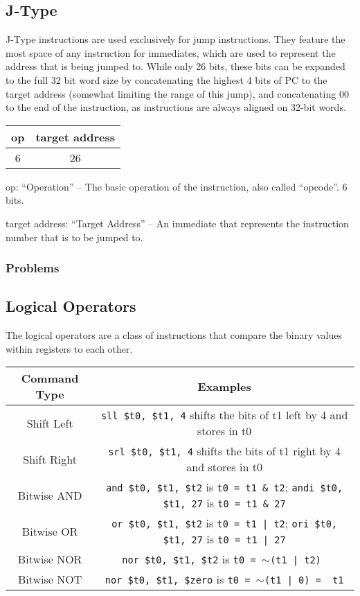\documentclass{article}
\begin{document}
\subsection{J-Type}\label{JType}

J-Type instructions are used exclusively for jump instructions. They feature the most space of any instruction for immediates, which are used to represent the address that is being jumped to. While only 26 bits, these bits can be expanded to the full 32 bit word size by concatenating the highest 4 bits of PC to the target address (somewhat limiting the range of this jump), and concatenating 00 to the end of the instruction, as instructions are always aligned on 32-bit words. 

\begin{tabular}{| c | c |}
    \hline
        op & target address \\
        \hline
        6 & 26 \\
    \hline
\end{tabular}

op: ``Operation'' -- The basic operation of the instruction, also called ``opcode''. 6 bits.

target address: ``Target Address'' -- An immediate that represents the instruction number that is to be jumped to. 

\subsubsection{Problems}\label{JTypeProblems}


\subsection{Logical Operators}

The logical operators are a class of instructions that compare the binary values within registers to each other. 

\begin{tabular}{| c | c |}
    \hline
        Command Type & Examples \\
        \hline
        Shift Left & \texttt{sll \$t0, \$t1, 4} shifts the bits of t1 left by 4 and stores in t0 \\
        \hline
        Shift Right & \texttt{srl \$t0, \$t1, 4} shifts the bits of t1 right by 4 and stores in t0 \\
    \hline
    Bitwise AND & \texttt{and \$t0, \$t1, \$t2} is \texttt{t0 = t1 \& t2}; \texttt{andi \$t0, \$t1, 27} is \texttt{t0 = t1 \& 27}\\
    \hline
    Bitwise OR & \texttt{or \$t0, \$t1, \$t2} is \texttt{t0 = t1 | t2}; \texttt{ori \$t0, \$t1, 27} is \texttt{t0 = t1 | 27} \\
    \hline
    Bitwise NOR  & \texttt{nor \$t0, \$t1, \$t2} is \texttt{t0 = $\sim$(t1 | t2) } \\
    \hline
    Bitwise NOT & \texttt{nor \$t0, \$t1, \$zero} is \texttt{t0 = $\sim$(t1 | 0) = ~t1} \\
    \hline
\end{tabular}
\end{document}
